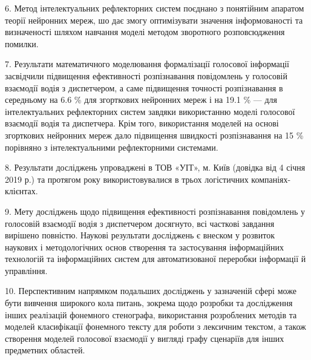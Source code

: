 6. Метод інтелектуальних рефлекторних систем поєднано з понятійним апаратом теорії нейронних мереж, шо дає змогу оптимізувати значення інформованості та визначеності шляхом навчання моделі методом зворотного розповсюдження помилки.

7. Результати математичного моделювання формалізації голосової інформації засвідчили підвищення ефективності розпізнавання повідомлень у голосовій взаємодії водія з диспетчером, а саме підвищення точності розпізнавання в середньому на 6.6 \% для згорткових нейронних мереж і на 19.1 \% --- для інтелектуальних рефлекторних систем завдяки використанню моделі голосової взаємодії водія та диспетчера. Крім того, використання моделей на основі згорткових нейронних мереж дало підвищення швидкості розпізнавання на 15 \% порівняно з інтелектуальними рефлекторними системами.

8. Результати досліджень упроваджені в ТОВ «УІТ», м. Київ (довідка від 4 січня 2019 р.) та протягом року використовувалися в трьох логістичних компаніях-клієнтах.

9. Мету досліджень щодо підвищення ефективності розпізнавання повідомлень у голосовій взаємодії водія з диспетчером досягнуто, всі часткові завдання вирішено повністю. Наукові результати досліджень є внеском у розвиток наукових і методологічних основ створення та застосування інформаційних технологій та інформаційних систем для автоматизованої переробки інформації й управління.

10. Перспективним напрямком подальших досліджень у зазначеній сфері може бути вивчення широкого кола питань, зокрема щодо розробки та дослідження інших реалізацій фонемного стенографа, використання розроблених методів та моделей класифікації фонемного тексту для роботи з лексичним текстом, а також створення моделей голосової взаємодії у вигляді графу сценаріїв для інших предметних областей.